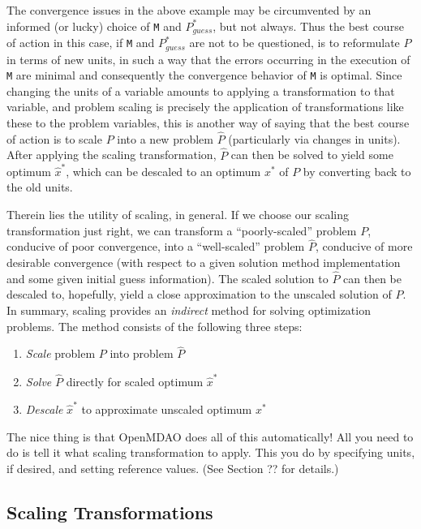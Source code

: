 \documentclass{article}
\begin{document}
The convergence issues in the above example may be circumvented by an informed (or lucky) choice of \texttt{M} and $P_{guess}^*$, but not always. Thus the best course of action in this case, if \texttt{M} and $P_{guess}^*$ are not to be questioned, is to reformulate $P$ in terms of new units, in such a way that the errors occurring in the execution of \texttt{M} are minimal and consequently the convergence behavior of \texttt{M} is optimal. Since changing the units of a variable amounts to applying a transformation to that variable, and problem scaling is precisely the application of transformations like these to the problem variables, this is another way of saying that the best course of action is to scale $P$ into a new problem $\hat{P}$ (particularly via changes in units). After applying the scaling transformation, $\hat{P}$ can then be solved to yield some optimum $\hat{x}^*$, which can be descaled to an optimum $x^*$ of $P$ by converting back to the old units.

Therein lies the utility of scaling, in general. If we choose our scaling transformation just right, we can transform a ``poorly-scaled'' problem $P$, conducive of poor convergence, into a ``well-scaled'' problem $\hat{P}$, conducive of more desirable convergence (with respect to a given solution method implementation and some given initial guess information). The scaled solution to $\hat{P}$ can then be descaled to, hopefully, yield a close approximation to the unscaled solution of $P$.
\\

\noindent
In summary, scaling provides an \textit{indirect} method for solving optimization problems. The method consists of the following three steps:
\begin{enumerate}
    \item \textit{Scale} problem $P$ into problem $\hat{P}$
    \item \textit{Solve} $\hat{P}$ directly for scaled optimum $\hat{x}^*$
    \item \textit{Descale} $\hat{x}^*$ to approximate unscaled optimum $x^*$
\end{enumerate}

\noindent
The nice thing is that OpenMDAO does all of this automatically! All you need to do is tell it what scaling transformation to apply. This you do by specifying units, if desired, and setting reference values. (See Section ?? for details.)

\subsection*{Scaling Transformations}
\end{document}
